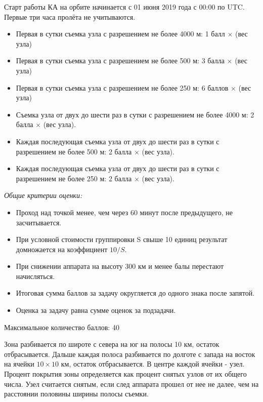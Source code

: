 Старт работы КА на орбите начинается с 01 июня 2019 года с 00:00 по UTC. Первые три часа пролёта не учитываются.

\markSection

\begin{itemize}
    \item Первая в сутки съемка узла с разрешением не более 4000 м: 1 балл $\times$ (вес узла)
    \item Первая в сутки съемка узла с разрешением не более 500 м: 3 балла $\times$ (вес узла)
    \item Первая в сутки съемка узла с разрешением не более 250 м: 6 баллов $\times$ (вес узла)
    \item Съемка узла от двух до шести раз в сутки с разрешением не более 4000 м: 2 балла $\times$ (вес узла).
    \item Каждая последующая съемка узла от двух до шести раз в сутки с разрешением не более 500 м: 2 балла $\times$ (вес узла).
    \item Каждая последующая съемка узла от двух до шести раз в сутки с разрешением не более 250 м: 2 балла $\times$ (вес узла).
\end{itemize}

\textit{Общие критерии оценки:}

\begin{itemize}
    \item Проход над точкой менее, чем через 60 минут после предыдущего, не засчитывается.
    \item При условной стоимости группировки S свыше 10 единиц результат домножается на коэффициент $10/S$.
    \item При снижении аппарата на высоту 300 км и менее балы перестают начисляться.
    \item Итоговая сумма баллов за задачу округляется до одного знака после запятой.
    \item Оценка за задачу равна сумме оценок за подзадачи.
\end{itemize}

Максимальное количество баллов: 40

Зона разбивается по широте с севера на юг на полосы 10 км, остаток отбрасывается. Дальше каждая полоса разбивается по долготе с запада на восток на ячейки $10 \times 10$ км, остаток отбрасывается. В центре каждой ячейки - узел. Процент покрытия зоны определяется как процент снятых узлов от их общего числа. Узел считается снятым, если след аппарата прошел от нее не далее, чем на расстоянии половины ширины полосы съемки. 

